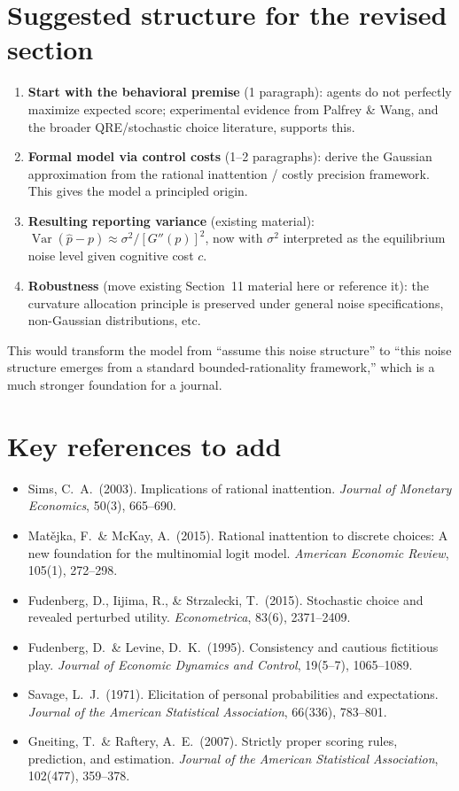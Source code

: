 \documentclass[11pt]{article}
\begin{document}
\section{Suggested structure for the revised section}

\begin{enumerate}
\item \textbf{Start with the behavioral premise} (1 paragraph): agents do not perfectly maximize expected score; experimental evidence from Palfrey \& Wang, and the broader QRE/stochastic choice literature, supports this.

\item \textbf{Formal model via control costs} (1--2 paragraphs): derive the Gaussian approximation from the rational inattention / costly precision framework. This gives the model a principled origin.

\item \textbf{Resulting reporting variance} (existing material): $\operatorname{Var}(\hat{p} - p) \approx \sigma^2 / [G''(p)]^2$, now with $\sigma^2$ interpreted as the equilibrium noise level given cognitive cost $c$.

\item \textbf{Robustness} (move existing Section~11 material here or reference it): the curvature allocation principle is preserved under general noise specifications, non-Gaussian distributions, etc.
\end{enumerate}

This would transform the model from ``assume this noise structure'' to ``this noise structure emerges from a standard bounded-rationality framework,'' which is a much stronger foundation for a journal.

\section{Key references to add}

\begin{itemize}
\item Sims, C.\ A.\ (2003). Implications of rational inattention. \emph{Journal of Monetary Economics}, 50(3), 665--690.
\item Mat\v{e}jka, F.\ \& McKay, A.\ (2015). Rational inattention to discrete choices: A new foundation for the multinomial logit model. \emph{American Economic Review}, 105(1), 272--298.
\item Fudenberg, D., Iijima, R., \& Strzalecki, T.\ (2015). Stochastic choice and revealed perturbed utility. \emph{Econometrica}, 83(6), 2371--2409.
\item Fudenberg, D.\ \& Levine, D.\ K.\ (1995). Consistency and cautious fictitious play. \emph{Journal of Economic Dynamics and Control}, 19(5--7), 1065--1089.
\item Savage, L.\ J.\ (1971). Elicitation of personal probabilities and expectations. \emph{Journal of the American Statistical Association}, 66(336), 783--801.
\item Gneiting, T.\ \& Raftery, A.\ E.\ (2007). Strictly proper scoring rules, prediction, and estimation. \emph{Journal of the American Statistical Association}, 102(477), 359--378.
\end{itemize}
\end{document}

